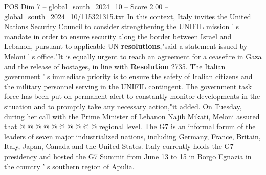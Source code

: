 \begin{textsample}{POS Dim 7 – global\_south\_2024\_10 – Score 2.00 – global\_south\_2024\_10/115321315.txt}
In this context, Italy invites the United Nations Security Council to consider strengthening the UNIFIL mission ' s mandate in order to ensure security along the border between Israel and Lebanon, pursuant to applicable UN \textbf{resolutions},"said a statement issued by Meloni ' s office."It is equally urgent to reach an agreement for a ceasefire in Gaza and the release of hostages, in line with \textbf{Resolution} 2735.
The Italian government ' s immediate priority is to ensure the safety of Italian citizens and the military personnel serving in the UNIFIL contingent.
The government task force has been put on permanent alert to constantly monitor developments in the situation and to promptly take any necessary action,"it added.
On Tuesday, during her call with the Prime Minister of Lebanon Najib Mikati, Meloni assured that @ @ @ @ @ @ @ @ @ @ regional level.
The G7 is an informal forum of the leaders of seven major industrialized nations, including Germany, France, Britain, Italy, Japan, Canada and the United States.
Italy currently holds the G7 presidency and hosted the G7 Summit from June 13 to 15 in Borgo Egnazia in the country ' s southern region of Apulia.

\end{textsample}
